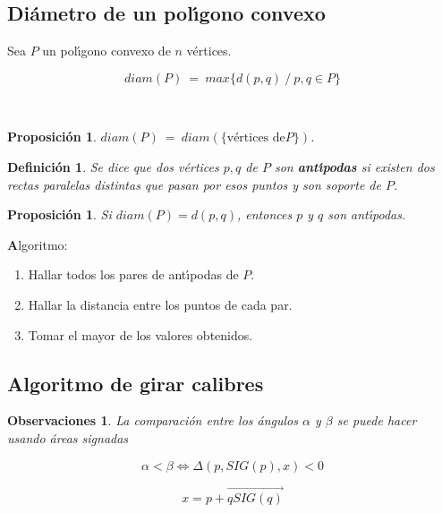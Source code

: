 \documentclass[ebook,oneside]{memoir}
\newtheorem{prop}[thm]{Proposición}
\newtheorem{defn}[thm]{Definición}
\newtheorem{rem}[thm]{Observaciones}
\begin{document}
\subsection{Di\'{a}metro de un pol\'{\i}gono convexo}

Sea $P$ un pol\'{\i}gono convexo de $n$ v\'{e}rtices.

 $$diam(P)\ = \ { max}\{d(p,q)\ / \ p,q \in P\}$$

\

\begin{prop} $diam(P) \ = \  diam(\{\mbox{v\'{e}rtices de
}P\})$.
\end{prop}

\begin{defn} Se dice que dos v\'{e}rtices $p,q$ de $P$ son
\textbf{ant\'{\i}podas} si existen dos rectas paralelas distintas que
pasan por esos puntos y son soporte de $P$.
\end{defn}

\begin{prop} Si $diam(P)=d(p,q)$, entonces $p$ y $q$
son ant\'{\i}podas.
\end{prop}

{\textbf Algoritmo:}

\begin{enumerate}
  \item Hallar todos los pares de ant\'{\i}podas de $P$.
  \item Hallar la distancia entre los puntos de cada par.
  \item Tomar el mayor de los valores obtenidos.
\end{enumerate}


\subsection{Algoritmo de girar calibres}


\begin{rem} La comparaci\'{o}n entre los \'{a}ngulos $\alpha$ y $\beta$ se puede hacer
usando \'{a}reas signadas

 $$\alpha<\beta \Leftrightarrow \Delta(p,SIG(p),x)<0$$

 $$x=p+\overrightarrow{qSIG(q)}$$

\end{rem}
\end{document}

